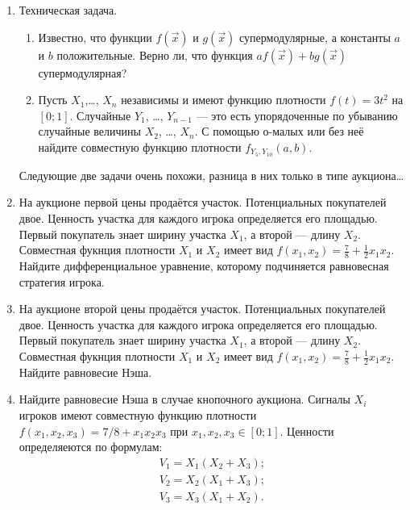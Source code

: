 \begin{enumerate}

\item Техническая задача.
\begin{enumerate}
\item Известно, что функции $ f(\vec{x}) $ и $ g(\vec{x}) $ супермодулярные, а константы $a$ и $b$ положительные. Верно ли, что функция $ af(\vec{x})+bg(\vec{x}) $ супермодулярная?

\item Пусть $ X_{1} $,\ldots, $ X_{n} $ независимы и имеют функцию плотности $ f(t)=3t^{2} $ на $ [0;1] $. Случайные $ Y_{1} $, \ldots, $ Y_{n-1} $ — это есть упорядоченные по убыванию случайные величины $ X_{2} $, \ldots, $ X_{n} $. С помощью о-малых или без неё найдите совместную функцию плотности $ f_{Y_{5},Y_{10}}(a,b) $.
\end{enumerate}

Следующие две задачи очень похожи, разница в них только в типе аукциона\ldots

\item На аукционе первой цены продаётся участок. Потенциальных покупателей двое. Ценность участка для каждого игрока определяется его площадью. Первый покупатель знает ширину участка $ X_{1} $, а второй — длину $X_{2}$. Совместная фукнция плотности $ X_{1} $ и $ X_{2} $ имеет вид $ f(x_{1},x_{2})=\frac{7}{8}+\frac{1}{2}x_{1}x_{2} $. Найдите дифференциальное уравнение, которому подчиняется равновесная стратегия игрока.

\item На аукционе второй цены продаётся участок. Потенциальных покупателей двое. Ценность участка для каждого игрока определяется его площадью. Первый покупатель знает ширину участка $ X_{1} $, а второй — длину $X_{2}$. Совместная фукнция плотности $ X_{1} $ и $ X_{2} $ имеет вид $ f(x_{1},x_{2})=\frac{7}{8}+\frac{1}{2}x_{1}x_{2} $. Найдите равновесие Нэша.


\item Найдите равновесие Нэша в случае кнопочного аукциона. Сигналы $ X_{i} $ игроков имеют совместную функцию плотности $ f(x_{1},x_{2},x_{3})=7/8+x_{1}x_{2}x_{3} $ при $ x_{1},x_{2},x_{3}\in[0;1] $. Ценности определяеются по формулам:
\begin{equation}
\begin{array}{c}
V_{1}=X_{1}(X_{2}+X_{3}); \\
V_{2}=X_{2}(X_{1}+X_{3}); \\
V_{3}=X_{3}(X_{1}+X_{2}).
\end{array}
\end{equation}



\end{enumerate}
